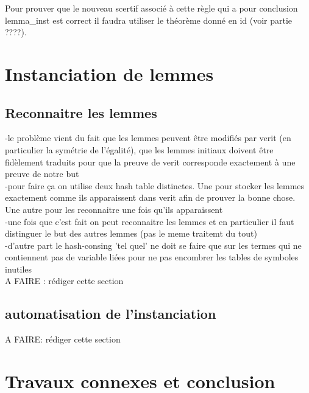 \documentclass[11pt]{article}
\begin{document}
Pour prouver que le nouveau scertif associé à cette règle qui a pour conclusion lemma\_inst est correct il faudra utiliser le théorème donné en id (voir partie ????).

\section{Instanciation de lemmes}

\subsection{Reconnaitre les lemmes}
-le problème vient du fait que les lemmes peuvent être modifiés par verit (en particulier la symétrie de l'égalité), que les lemmes initiaux doivent être fidèlement traduits pour que la preuve de verit corresponde exactement à une preuve de notre but \\
-pour faire ça on utilise deux hash table distinctes. Une pour stocker les lemmes exactement comme ils apparaissent dans verit afin de prouver la bonne chose. Une autre pour les reconnaitre une fois qu'ils apparaissent\\
-une fois que c'est fait on peut reconnaitre les lemmes et en particulier il faut distinguer le but des autres lemmes (pas le meme traitemt du tout)\\
-d'autre part le hash-consing 'tel quel' ne doit se faire que sur les termes qui ne contiennent pas de variable liées pour ne pas encombrer les tables de symboles inutiles\\

A FAIRE : rédiger cette section


\subsection{automatisation de l'instanciation}

A FAIRE: rédiger cette section


\section{Travaux connexes et conclusion}
\end{document}
